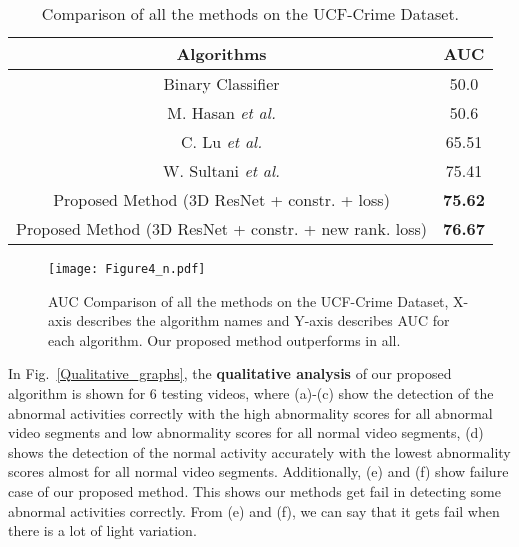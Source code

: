 \documentclass[conference]{IEEEtran}
\begin{document}
\begin{table}
\caption{Comparison of all the methods on the UCF-Crime Dataset.}
\centering
\begin{tabular}{|c|c|}
\hline
\textbf{Algorithms}                     & \textbf{AUC}                         \\ \hline
Binary Classifier                       & 50.0                                 \\ 
M. Hasan \textit{et al.} \cite{A11}     & 50.6                                 \\ 
C. Lu \textit{et al.} \cite{A9}         & 65.51                                \\ 
W. Sultani \textit{et al.} \cite{A6}    & 75.41                                \\ 
Proposed Method (3D ResNet + constr. + loss) &  \textbf{75.62}                        \\ 
Proposed Method (3D ResNet + constr. + new rank. loss)    & {\textbf{76.67}} \\ \hline
\end{tabular}

\label{AUC_table}
\end{table}

\begin{figure}

	\begin{center}
\texttt{[image: Figure4\_n.pdf]}
		
	\end{center}
	\caption{AUC Comparison of all the methods on the UCF-Crime Dataset, X- axis describes the algorithm names and Y-axis describes AUC for each algorithm. Our proposed method outperforms in all.}
	\label{AUC_Graph}
	
\end{figure}


In Fig.~\ref{Qualitative_graphs}, the \textbf{qualitative analysis} of our proposed algorithm is shown for 6 testing videos, where (a)-(c) show the detection of the abnormal activities correctly with the high abnormality scores for all abnormal video segments and low abnormality scores for all normal video segments, (d) shows the detection of the normal activity accurately with the lowest abnormality scores almost  for all normal video segments. Additionally, (e) and (f) show failure case of our proposed method. This shows our methods get fail in detecting some abnormal activities correctly. From (e) and (f), we can say that it gets fail when there is a lot of light variation.  
\end{document}
